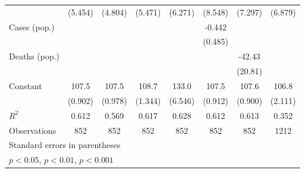 \documentclass{article}
\begin{document}
{\begin{longtable}{l*{7}{c}}
                &  (5.454)         &  (4.804)         &  (5.471)         &  (6.271)         &  (8.548)         &  (7.297)         &  (6.879)         \\
Cases (pop.)    &                  &                  &                  &                  &   -0.442         &                  &                  \\
                &                  &                  &                  &                  &  (0.485)         &                  &                  \\
Deaths (pop.)   &                  &                  &                  &                  &                  &   -42.43         &                  \\
                &                  &                  &                  &                  &                  &  (20.81)         &                  \\
Constant        &    107.5\sym{***}&    107.5\sym{***}&    108.7\sym{***}&    133.0\sym{***}&    107.5\sym{***}&    107.6\sym{***}&    106.8\sym{***}\\
                &  (0.902)         &  (0.978)         &  (1.344)         &  (6.546)         &  (0.912)         &  (0.900)         &  (2.111)         \\
\hline
\(R^{2}\)       &    0.612         &    0.569         &    0.617         &    0.628         &    0.612         &    0.613         &    0.352         \\
Observations    &      852         &      852         &      852         &      852         &      852         &      852         &     1212         \\
\hline\hline
\multicolumn{8}{l}{\footnotesize Standard errors in parentheses}\\
\multicolumn{8}{l}{\footnotesize \sym{*} \(p<0.05\), \sym{**} \(p<0.01\), \sym{***} \(p<0.001\)}\\
\end{longtable}
}
\end{document}
